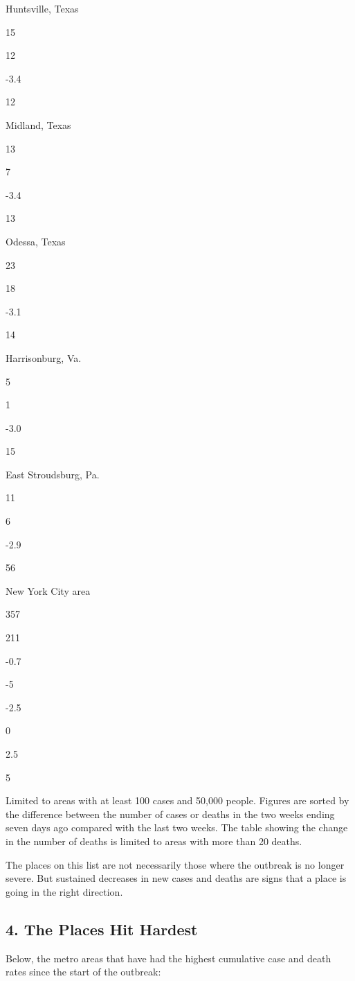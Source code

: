 Huntsville, Texas

15

12

-3.4

12

Midland, Texas

13

7

-3.4

13

Odessa, Texas

23

18

-3.1

14

Harrisonburg, Va.

5

1

-3.0

15

East Stroudsburg, Pa.

11

6

-2.9

56

New York City area

357

211

-0.7

-5

-2.5

0

2.5

5

Limited to areas with at least 100 cases and 50,000 people. Figures are
sorted by the difference between the number of cases or deaths in the
two weeks ending seven days ago compared with the last two weeks. The
table showing the change in the number of deaths is limited to areas
with more than 20 deaths.

The places on this list are not necessarily those where the outbreak is
no longer severe. But sustained decreases in new cases and deaths are
signs that a place is going in the right direction.

\hypertarget{4-the-places-hit-hardest}{%
\subsection{4. The Places Hit Hardest}\label{4-the-places-hit-hardest}}

Below, the metro areas that have had the highest cumulative case and
death rates since the start of the outbreak:

